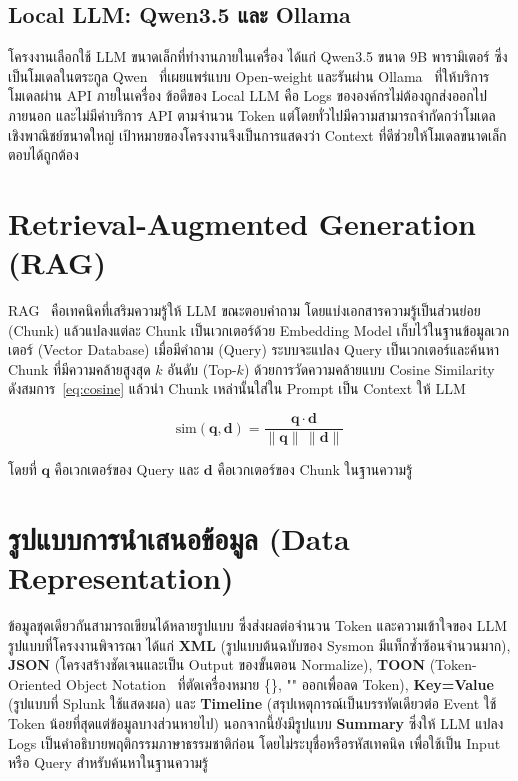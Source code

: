\subsection{Local LLM: Qwen3.5 และ Ollama}
โครงงานเลือกใช้ LLM ขนาดเล็กที่ทำงานภายในเครื่อง ได้แก่ Qwen3.5 ขนาด 9B พารามิเตอร์
ซึ่งเป็นโมเดลในตระกูล Qwen~\cite{qwen3} ที่เผยแพร่แบบ Open-weight
และรันผ่าน Ollama~\cite{ollama} ที่ให้บริการโมเดลผ่าน API ภายในเครื่อง
ข้อดีของ Local LLM คือ Logs ขององค์กรไม่ต้องถูกส่งออกไปภายนอก และไม่มีค่าบริการ API ตามจำนวน Token
แต่โดยทั่วไปมีความสามารถจำกัดกว่าโมเดลเชิงพาณิชย์ขนาดใหญ่
เป้าหมายของโครงงานจึงเป็นการแสดงว่า Context ที่ดีช่วยให้โมเดลขนาดเล็กตอบได้ถูกต้อง

\section{Retrieval-Augmented Generation (RAG)}
RAG~\cite{lewis2020rag} คือเทคนิคที่เสริมความรู้ให้ LLM ขณะตอบคำถาม
โดยแบ่งเอกสารความรู้เป็นส่วนย่อย (Chunk) แล้วแปลงแต่ละ Chunk เป็นเวกเตอร์ด้วย Embedding Model
เก็บไว้ในฐานข้อมูลเวกเตอร์ (Vector Database)
เมื่อมีคำถาม (Query) ระบบจะแปลง Query เป็นเวกเตอร์และค้นหา Chunk ที่มีความคล้ายสูงสุด $k$ อันดับ (Top-$k$)
ด้วยการวัดความคล้ายแบบ Cosine Similarity ดังสมการ~\eqref{eq:cosine}
แล้วนำ Chunk เหล่านั้นใส่ใน Prompt เป็น Context ให้ LLM

\begin{equation}\label{eq:cosine}
\mathrm{sim}(\mathbf{q},\mathbf{d}) = \frac{\mathbf{q}\cdot\mathbf{d}}{\lVert\mathbf{q}\rVert\,\lVert\mathbf{d}\rVert}
\end{equation}

\noindent
โดยที่ $\mathbf{q}$ คือเวกเตอร์ของ Query และ $\mathbf{d}$ คือเวกเตอร์ของ Chunk ในฐานความรู้

\section{รูปแบบการนำเสนอข้อมูล (Data Representation)}
ข้อมูลชุดเดียวกันสามารถเขียนได้หลายรูปแบบ ซึ่งส่งผลต่อจำนวน Token และความเข้าใจของ LLM
รูปแบบที่โครงงานพิจารณา ได้แก่
\textbf{XML} (รูปแบบต้นฉบับของ Sysmon มีแท็กซ้ำซ้อนจำนวนมาก),
\textbf{JSON} (โครงสร้างชัดเจนและเป็น Output ของขั้นตอน Normalize),
\textbf{TOON} (Token-Oriented Object Notation~\cite{toon-format} ที่ตัดเครื่องหมาย \{\}, "" ออกเพื่อลด Token),
\textbf{Key=Value} (รูปแบบที่ Splunk ใช้แสดงผล) และ
\textbf{Timeline} (สรุปเหตุการณ์เป็นบรรทัดเดียวต่อ Event ใช้ Token น้อยที่สุดแต่ข้อมูลบางส่วนหายไป)
นอกจากนี้ยังมีรูปแบบ \textbf{Summary} ซึ่งให้ LLM แปลง Logs เป็นคำอธิบายพฤติกรรมภาษาธรรมชาติก่อน โดยไม่ระบุชื่อหรือรหัสเทคนิค เพื่อใช้เป็น Input หรือ Query สำหรับค้นหาในฐานความรู้

